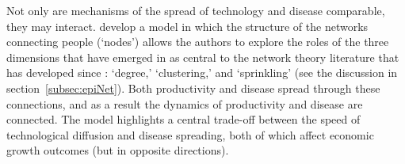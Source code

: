 
Not only are mechanisms of the spread of technology and disease comparable, they may interact.  \href{https://github.com/iworld1991/EpiExp/blob/master/Literature/fogli2012germs.pdf}{\cite{fogli2021germs}} develop a model in which the structure of the networks connecting people (`nodes') allows the authors to explore the roles of the three dimensions that have emerged in as central to the network theory literature that has developed since \cite{erdos1960evolution}: `degree,' `clustering,' and `sprinkling' (see the discussion in section~\ref{subsec:epiNet}).  Both productivity and disease spread through these connections, and as a result the dynamics of productivity and disease are connected.  The model highlights a central trade-off between the speed of technological diffusion and disease spreading, both of which affect economic growth outcomes (but in opposite directions).


